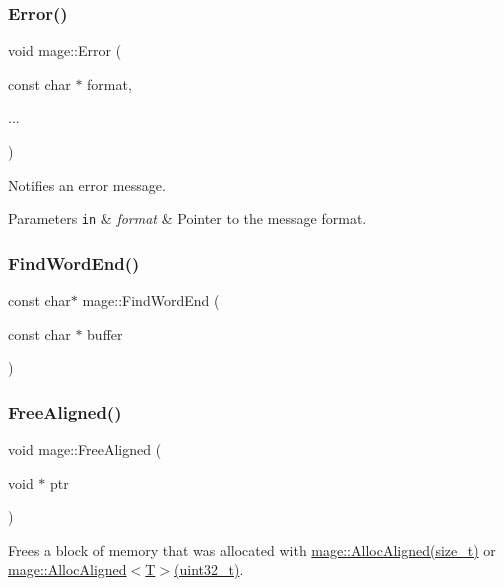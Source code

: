 \hypertarget{namespacemage_a52a7fe8c9ce39afd9e0b0299373db0fa}{}\label{namespacemage_a52a7fe8c9ce39afd9e0b0299373db0fa} 
\subsubsection{\texorpdfstring{Error()}{Error()}}
{\footnotesize\ttfamily void mage\+::\+Error (\begin{DoxyParamCaption}\item[{const char $\ast$}]{format,  }\item[{}]{... }\end{DoxyParamCaption})}

Notifies an error message.


\begin{DoxyParams}[1]{Parameters}
\mbox{\tt in}  & {\em format} & Pointer to the message format. \\
\hline
\end{DoxyParams}
\hypertarget{namespacemage_ab2e62d950dc620167f4128cb16033998}{}\label{namespacemage_ab2e62d950dc620167f4128cb16033998} 
\subsubsection{\texorpdfstring{Find\+Word\+End()}{FindWordEnd()}}
{\footnotesize\ttfamily const char$\ast$ mage\+::\+Find\+Word\+End (\begin{DoxyParamCaption}\item[{const char $\ast$}]{buffer }\end{DoxyParamCaption})}

\hypertarget{namespacemage_a401c54df21447c491c527735647b5f80}{}\label{namespacemage_a401c54df21447c491c527735647b5f80} 
\subsubsection{\texorpdfstring{Free\+Aligned()}{FreeAligned()}}
{\footnotesize\ttfamily void mage\+::\+Free\+Aligned (\begin{DoxyParamCaption}\item[{void $\ast$}]{ptr }\end{DoxyParamCaption})}

Frees a block of memory that was allocated with \hyperlink{namespacemage_a7d706913bb9fb322c938cd3e4d8eaede}{mage\+::\+Alloc\+Aligned(size\+\_\+t)} or \hyperlink{namespacemage_ae2f31ba64620694aa0dfc8ca6e5d5941}{mage\+::\+Alloc\+Aligned$<$\+T$>$(uint32\+\_\+t)}.


